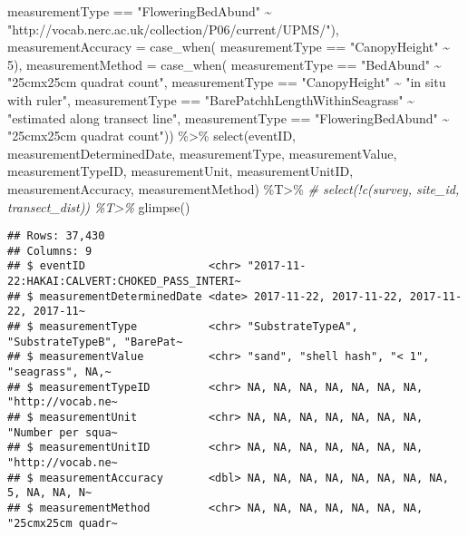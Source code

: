\documentclass[
]{book}
\newenvironment{Shaded}{\begin{snugshade}}{\end{snugshade}}
\newcommand{\AttributeTok}[1]{\textcolor[rgb]{0.77,0.63,0.00}{#1}}
\newcommand{\CommentTok}[1]{\textcolor[rgb]{0.56,0.35,0.01}{\textit{#1}}}
\newcommand{\DecValTok}[1]{\textcolor[rgb]{0.00,0.00,0.81}{#1}}
\newcommand{\FunctionTok}[1]{\textcolor[rgb]{0.00,0.00,0.00}{#1}}
\newcommand{\NormalTok}[1]{#1}
\newcommand{\SpecialCharTok}[1]{\textcolor[rgb]{0.00,0.00,0.00}{#1}}
\newcommand{\StringTok}[1]{\textcolor[rgb]{0.31,0.60,0.02}{#1}}
\begin{document}
\begin{Shaded}
\begin{Highlighting}[]
\NormalTok{      measurementType }\SpecialCharTok{==} \StringTok{"FloweringBedAbund"} \SpecialCharTok{\textasciitilde{}} \StringTok{"http://vocab.nerc.ac.uk/collection/P06/current/UPMS/"}\NormalTok{),}
    \AttributeTok{measurementAccuracy =} \FunctionTok{case\_when}\NormalTok{(}
\NormalTok{      measurementType }\SpecialCharTok{==} \StringTok{"CanopyHeight"} \SpecialCharTok{\textasciitilde{}} \DecValTok{5}\NormalTok{),}
    \AttributeTok{measurementMethod =} \FunctionTok{case\_when}\NormalTok{(}
\NormalTok{      measurementType }\SpecialCharTok{==} \StringTok{"BedAbund"} \SpecialCharTok{\textasciitilde{}} \StringTok{"25cmx25cm quadrat count"}\NormalTok{,}
\NormalTok{      measurementType }\SpecialCharTok{==} \StringTok{"CanopyHeight"} \SpecialCharTok{\textasciitilde{}} \StringTok{"in situ with ruler"}\NormalTok{,}
\NormalTok{      measurementType }\SpecialCharTok{==} \StringTok{"BarePatchhLengthWithinSeagrass"} \SpecialCharTok{\textasciitilde{}} \StringTok{"estimated along transect line"}\NormalTok{,}
\NormalTok{      measurementType }\SpecialCharTok{==} \StringTok{"FloweringBedAbund"} \SpecialCharTok{\textasciitilde{}} \StringTok{"25cmx25cm quadrat count"}\NormalTok{)) }\SpecialCharTok{\%\textgreater{}\%}
  \FunctionTok{select}\NormalTok{(eventID, measurementDeterminedDate, measurementType, measurementValue,}
\NormalTok{         measurementTypeID, measurementUnit, measurementUnitID, measurementAccuracy,}
\NormalTok{         measurementMethod) }\SpecialCharTok{\%T\textgreater{}\%}
\CommentTok{\#  select(!c(survey, site\_id, transect\_dist)) \%T\textgreater{}\%}
  \FunctionTok{glimpse}\NormalTok{()}
\end{Highlighting}
\end{Shaded}

\begin{verbatim}
## Rows: 37,430
## Columns: 9
## $ eventID                   <chr> "2017-11-22:HAKAI:CALVERT:CHOKED_PASS_INTERI~
## $ measurementDeterminedDate <date> 2017-11-22, 2017-11-22, 2017-11-22, 2017-11~
## $ measurementType           <chr> "SubstrateTypeA", "SubstrateTypeB", "BarePat~
## $ measurementValue          <chr> "sand", "shell hash", "< 1", "seagrass", NA,~
## $ measurementTypeID         <chr> NA, NA, NA, NA, NA, NA, NA, "http://vocab.ne~
## $ measurementUnit           <chr> NA, NA, NA, NA, NA, NA, NA, "Number per squa~
## $ measurementUnitID         <chr> NA, NA, NA, NA, NA, NA, NA, "http://vocab.ne~
## $ measurementAccuracy       <dbl> NA, NA, NA, NA, NA, NA, NA, NA, 5, NA, NA, N~
## $ measurementMethod         <chr> NA, NA, NA, NA, NA, NA, NA, "25cmx25cm quadr~
\end{verbatim}
\end{document}
